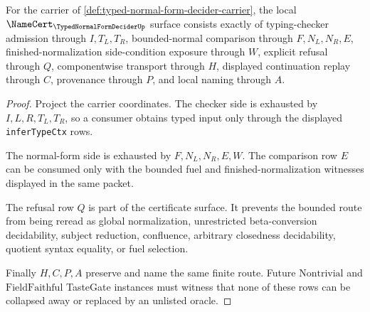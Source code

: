 \begin{theorem}
\label{thm:typed-normal-form-decider-namecert-obligations}
For the carrier of \autoref{def:typed-normal-form-decider-carrier}, the local $\NameCert_{\TypedNormalFormDeciderUp}$ surface consists exactly of typing-checker admission through $I,T_L,T_R$, bounded-normal comparison through $F,N_L,N_R,E$, finished-normalization side-condition exposure through $W$, explicit refusal through $Q$, componentwise transport through $H$, displayed continuation replay through $C$, provenance through $P$, and local naming through $A$.
\end{theorem}
\begin{proof}
Project the carrier coordinates. The checker side is exhausted by $I,L,R,T_L,T_R$, so a consumer obtains typed input only through the displayed \texttt{inferTypeCtx} rows.

The normal-form side is exhausted by $F,N_L,N_R,E,W$. The comparison row $E$ can be consumed only with the bounded fuel and finished-normalization witnesses displayed in the same packet.

The refusal row $Q$ is part of the certificate surface. It prevents the bounded route from being reread as global normalization, unrestricted beta-conversion decidability, subject reduction, confluence, arbitrary closedness decidability, quotient syntax equality, or fuel selection.

Finally $H,C,P,A$ preserve and name the same finite route. Future $\mathrm{Nontrivial}$ and $\mathrm{FieldFaithful}$ TasteGate instances must witness that none of these rows can be collapsed away or replaced by an unlisted oracle.
\end{proof}

